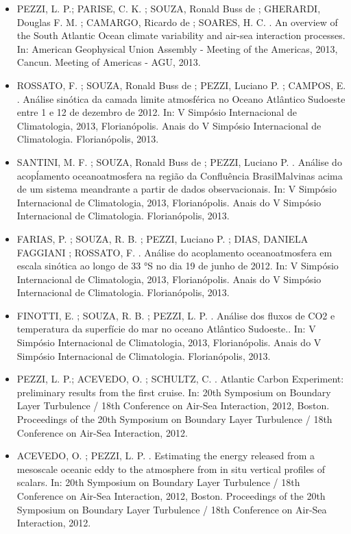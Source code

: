 \documentclass[11pt, a4paper]{awesome-cv}
\begin{document}
\begin{cvletter}
\begin{itemize}
\item[] PEZZI, L. P.; PARISE, C. K. ; SOUZA, Ronald Buss de ; GHERARDI, Douglas F. M. ; CAMARGO, Ricardo de ; SOARES, H. C. . An overview of the South Atlantic Ocean climate variability and air-sea interaction processes. In: American Geophysical Union Assembly - Meeting of the Americas, 2013, Cancun. Meeting of Americas - AGU, 2013.
\item[] ROSSATO, F. ; SOUZA, Ronald Buss de ; PEZZI, Luciano P. ; CAMPOS, E. . Análise sinótica da camada limite atmosférica no Oceano Atlântico Sudoeste entre 1 e 12 de dezembro de 2012. In: V Simpósio Internacional de Climatologia, 2013, Florianópolis. Anais do V Simpósio Internacional de Climatologia. Florianópolis, 2013.
\item[] SANTINI, M. F. ; SOUZA, Ronald Buss de ; PEZZI, Luciano P. . Análise do acopĺamento oceano­atmosfera na região da Confluência Brasil­Malvinas acima de um sistema meandrante a partir de dados observacionais. In: V Simpósio Internacional de Climatologia, 2013, Florianópolis. Anais do V Simpósio Internacional de Climatologia. Florianópolis, 2013.
\item[] FARIAS, P. ; SOUZA, R. B. ; PEZZI, Luciano P. ; DIAS, DANIELA FAGGIANI ; ROSSATO, F. . Análise do acoplamento oceano­atmosfera em escala sinótica ao longo de 33 °S no dia 19 de junho de 2012. In: V Simpósio Internacional de Climatologia, 2013, Florianópolis. Anais do V Simpósio Internacional de Climatologia. Florianópolis, 2013. 
\item[] FINOTTI, E. ; SOUZA, R. B. ; PEZZI, L. P. . Análise dos fluxos de CO2 e temperatura da superfície do mar no oceano Atlântico Sudoeste.. In: V Simpósio Internacional de Climatologia, 2013, Florianópolis. Anais do V Simpósio Internacional de Climatologia. Florianópolis, 2013. 
\item[] PEZZI, L. P.; ACEVEDO, O. ; SCHULTZ, C. . Atlantic Carbon Experiment: preliminary results from the first cruise. In: 20th Symposium on Boundary Layer Turbulence / 18th Conference on Air-Sea Interaction, 2012, Boston. Proceedings of the 20th Symposium on Boundary Layer Turbulence / 18th Conference on Air-Sea Interaction, 2012. 
\item[] ACEVEDO, O. ; PEZZI, L. P. . Estimating the energy released from a mesoscale oceanic eddy to the atmosphere from in situ vertical profiles of scalars. In: 20th Symposium on Boundary Layer Turbulence / 18th Conference on Air-Sea Interaction, 2012, Boston. Proceedings of the 20th Symposium on Boundary Layer Turbulence / 18th Conference on Air-Sea Interaction, 2012. 

\end{itemize}
\end{cvletter}
\end{document}
